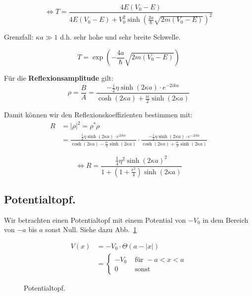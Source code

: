   \begin{equation}
    \label{eq:32}
    \Leftrightarrow T = \frac{4 E (V_0-E)}{4 E (V_0-E)+V_0^2 \sinh\left(\frac{2a}\hbar
        \sqrt{2 m (V_0 - E)} \right)^2}
  \end{equation}

Grenzfall: \( \kappa a \gg 1 \) d.h. sehr hohe und sehr breite Schwelle.

\[ T = \exp \left(-\frac {4a}\hbar \sqrt{2m(V_0-E)} \right) \]

Für die \textbf{Reflexionsamplitude} gilt:
\[ \rho = \frac B A = \frac{-\frac i 2 \eta \sinh(2 \kappa a)
          \cdot e^{-2 i k a}}
        {\cosh(2 \kappa a)+\frac{i\epsilon}{2} \sinh(2 \kappa a)} \]

Damit können wir den Reflexionskoeffizienten bestimmen mit:
\begin{align*}
  R &= |\rho|^2 = \rho^*\rho \\
    &= \frac{\frac i 2 \eta \sinh(2 \kappa a)
          \cdot e^{2 i k a}}
        {\cosh(2 \kappa a)-\frac{i\epsilon}{2} \sinh(2 \kappa a)} \cdot
       \frac{-\frac i 2 \eta \sinh(2 \kappa a)
          \cdot e^{-2 i k a}}
        {\cosh(2 \kappa a)+\frac{i\epsilon}{2} \sinh(2 \kappa a)}
\end{align*}

  \begin{equation}
    \label{eq:32Rkoef}
    \Leftrightarrow R = \frac{\frac 1 4 \eta^2 \sinh(2 \kappa a)^2}
    {1+\left(1+\frac {\epsilon^2} 4 \right) \sinh(2 \kappa a)}
  \end{equation}

\subsection{Potentialtopf.}
Wir betrachten einen Potentialtopf mit einem Potential von $-V_0$ in dem
Bereich von $-a$ bis $a$ sonst Null. Siehe dazu Abb.~\ref{fig:7}
  
\begin{figure}[htbp]
  \begin{minipage}[h]{0.45\linewidth}
    \begin{align*}
      V(x)&=-V_0\cdot\Theta\left(a-|x|\right) \\
      &= \begin{cases}
        -V_0 & \mbox{ für }-a<x<a\\
        0 & \mbox{ sonst}
      \end{cases}
    \end{align*}
    \vspace{1cm}
  \end{minipage}
  \hfill
  \begin{minipage}[h]{0.5\linewidth}
    
  \end{minipage}
  \caption{Potentialtopf.}
  \label{fig:7}
\end{figure}


